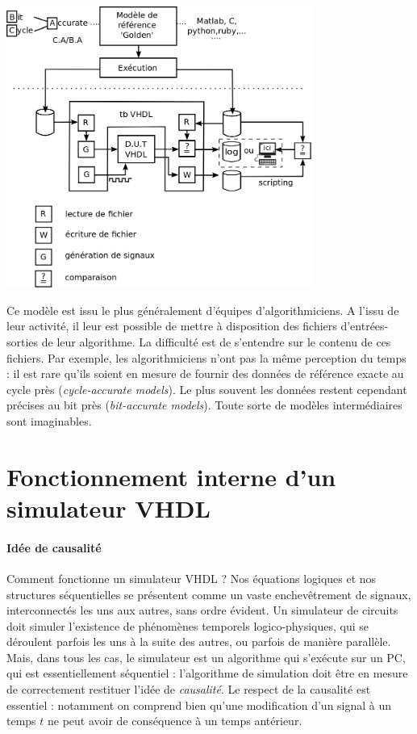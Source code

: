 \begin{center}
\begin{minipage}[t]{8cm}
 \centering
 \includegraphics[width=10cm]{./figures/flot_testbench.png}
\end{minipage}
\end{center}

Ce modèle est issu le plus généralement d'équipes d'algorithmiciens. A l'issu de leur activité, il leur est possible
de mettre à disposition des fichiers d'entrées-sorties de leur algorithme. La difficulté est de s'entendre sur le contenu de
ces fichiers. Par exemple, les algorithmiciens n'ont pas la même perception du temps : il est rare qu'ils soient en mesure
de fournir des données de référence exacte au cycle près ({\it cycle-accurate models}). Le plus souvent les données
restent cependant précises au bit près ({\it bit-accurate models}). Toute sorte de modèles intermédiaires sont imaginables.

\section{Fonctionnement interne d'un simulateur VHDL}
\paragraph{Idée de causalité}
Comment fonctionne un simulateur VHDL ? Nos équations logiques et nos structures séquentielles se présentent comme
un vaste enchevêtrement de signaux, interconnectés les uns aux autres, sans ordre évident.
Un simulateur de circuits doit simuler l'existence de phénomènes
temporels logico-physiques, qui se déroulent parfois les uns à la suite des autres, ou parfois de manière parallèle.
 Mais, dans tous les cas, le simulateur est un algorithme
qui s'exécute sur un PC, qui est essentiellement séquentiel : l'algorithme de simulation doit être en mesure de correctement restituer
l'idée de {\it causalité}. Le respect de la causalité est essentiel : notamment on comprend bien qu'une modification d'un signal à un temps $t$ ne peut
avoir de conséquence à un temps antérieur.

